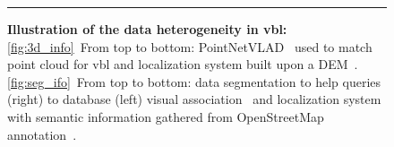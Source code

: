 \begin{figure}[t]
\begin{minipage}{0.48\linewidth}
		\noindent\rule{\linewidth}{0.4pt}		
		
	\end{minipage}
	\caption[Illustration of the data heterogeneity in \ac{vbl}]{\textbf{Illustration of the data heterogeneity in \ac{vbl}:} \ref{fig:3d_info}~From top to bottom: PointNetVLAD~\citep{Uy2018} used to match point cloud for \acs{vbl} and localization system built upon a DEM~\citep{Matei2013}. \ref{fig:seg_ifo}~From top to bottom: data segmentation to help queries (right) to database (left) visual association~\citep{Schonberger2017a} and localization system with semantic information gathered from OpenStreetMap annotation~\citep{Ardeshir2014}. \label{fig:data_div}}
\end{figure}